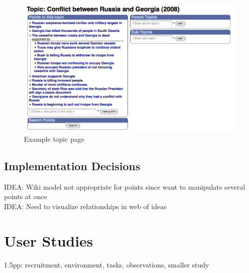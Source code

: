\documentclass{sig-alt-release2}
\newcommand{\idea}[1]{{\color{blue} IDEA: #1}\\}
\begin{document}
\begin{figure}[ht]
	\includegraphics[scale=0.3]{../screenshots/topicpage_sm.jpg}
	\caption{Example topic page}
	\label{topicpage}
\end{figure}

\subsection{Implementation Decisions}

\idea{Wiki model not appropriate for points since want to manipulate several points at once}
\idea{Need to visualize relationships in web of ideas}


% 
% 
% 
% 


\section{User Studies}
1.5pp: recruitment, environment, tasks, observations, smaller study
\end{document}
